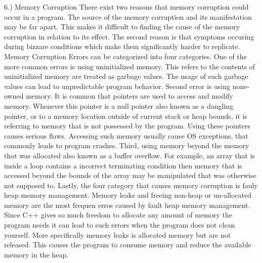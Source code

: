 \documentclass[letterpaper, 12pt]{article}
\begin{document}
6.) Memory Corruption
		There exist two reasons that memory corruption could occur in a program. The source of the memory corruption and its manifestation may be far apart. This makes it difficult to finding the cause of the memory corruption in relation to its effect. The second reason is that symptoms occuring during bizzare conditions which make them significantly harder to replicate. Memory Corruption Errors can be categorized into four categories. One of the more common errors is using uninitialized memory. This refers to the contents of uninitialized memory are treated as garbage values. The usage of such garbage values can lead to unpredictable program behavior. Second error is using none-owned memory. It is common that pointers are used to access and modify memory. Whenever this pointer is a null pointer also known as a dangling pointer, or to a memory location outside of current stack or heap bounds, it is referring to memory that is not possessed by the program. Using these pointers causes serious flaws. Accessing such memory usually cause OS exceptions, that commonly leads to program crashes. Third, using memory beyond the memory that was allocated also known as a buffer overflow. For example, an array that is inside a loop contains a incorrect terminating condition then memory that is accessed beyond the bounds of the array may be manipulated that was otherwise not supposed to. Lastly, the four category that causes memory corruption is fauly heap memory management. Memory leaks and freeing non-heap or un-allocated memory are the most frequen erros caused by fault heap memory management. Since C++ gives so much freedom to allocate any amount of memory the program needs it can lead to such errors when the program does not clean yourself. More specifically memory leaks is allocated memory but are not released. This causes the program to consume memory and reduce the available memory in the heap.
	
\end{document}
